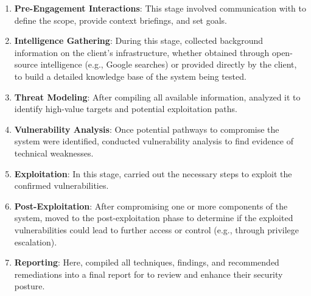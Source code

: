 \begin{enumerate}
    \item \textbf{Pre-Engagement Interactions}: This stage involved communication with \client to define the scope, provide context briefings, and set goals.
    \item \textbf{Intelligence Gathering}: During this stage, \team collected background information on the client's infrastructure, whether obtained through open-source intelligence (e.g., Google searches) or provided directly by the client, to build a detailed knowledge base of the system being tested.
    \item \textbf{Threat Modeling}: After compiling all available information, \team analyzed it to identify high-value targets and potential exploitation paths.
    \item \textbf{Vulnerability Analysis}: Once potential pathways to compromise the system were identified, \team conducted vulnerability analysis to find evidence of technical weaknesses.
    \item \textbf{Exploitation}: In this stage, \team carried out the necessary steps to exploit the confirmed vulnerabilities.
    \item \textbf{Post-Exploitation}: After compromising one or more components of the system, \team moved to the post-exploitation phase to determine if the exploited vulnerabilities could lead to further access or control (e.g., through privilege escalation).
    \item \textbf{Reporting}: Here, \team compiled all techniques, findings, and recommended remediations into a final report for \client to review and enhance their security posture.
\end{enumerate}


\newpage





